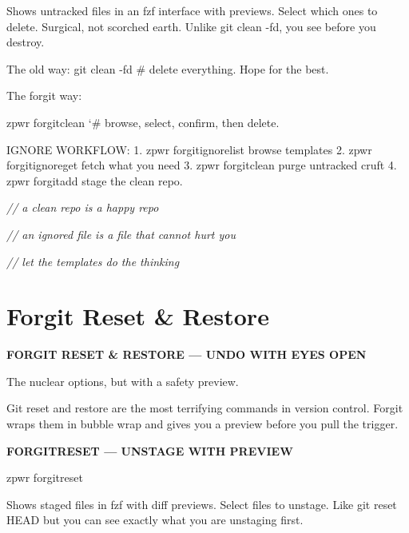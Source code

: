 \documentclass[11pt,a4paper,twoside]{book}
\begin{document}
Shows untracked files in an fzf interface with previews. Select which ones to delete. Surgical, not scorched earth. Unlike git clean -fd, you see before you destroy.

The old way: git clean -fd    \# delete everything. Hope for the best.

The forgit way:

\begin{codebox}
\color{neongreen}zpwr forgitclean  {\char`\#} browse, select, confirm, then delete.\\
\end{codebox}

IGNORE WORKFLOW: 1. zpwr forgitignorelist    browse templates 2. zpwr forgitignoreget     fetch what you need 3. zpwr forgitclean         purge untracked cruft 4. zpwr forgitadd           stage the clean repo.

{\small\itshape\color{dimtext} // a clean repo is a happy repo}

{\small\itshape\color{dimtext} // an ignored file is a file that cannot hurt you}

{\small\itshape\color{dimtext} // let the templates do the thinking}


\vspace{16pt}

\section{Forgit Reset \& Restore}


\vspace{10pt}
{\large\bfseries\color{neoncyan} FORGIT RESET \& RESTORE — UNDO WITH EYES OPEN}\vspace{6pt}

The nuclear options, but with a safety preview.

Git reset and restore are the most terrifying commands in version control. Forgit wraps them in bubble wrap and gives you a preview before you pull the trigger.


\vspace{12pt}
{\bfseries\color{neonyellow} FORGITRESET — UNSTAGE WITH PREVIEW}\vspace{4pt}

\begin{codebox}
\color{neongreen}zpwr forgitreset\\
\end{codebox}

Shows staged files in fzf with diff previews. Select files to unstage. Like git reset HEAD but you can see exactly what you are unstaging first.
\end{document}
